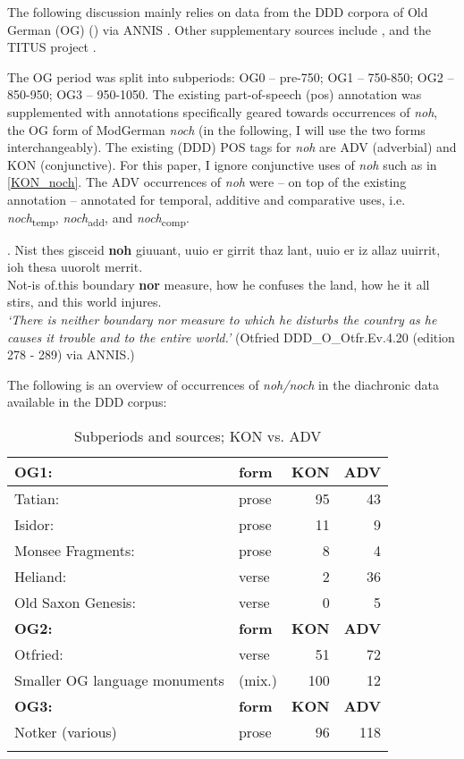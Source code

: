 \documentclass[output=paper,
modfonts
]{langscibook}
\begin{document}
The following discussion mainly relies on data from the DDD corpora of Old German (OG) (\citeauthor{ddd_OG}) via ANNIS \citep{annis_og}. Other supplementary sources include \citep{kali}, and the TITUS project \citep{titus}.

The OG period was split into subperiods: OG0 -- pre-750; OG1 -- 750-850; OG2 -- 850-950; OG3 -- 950-1050. The existing part-of-speech (pos) annotation was supplemented with annotations specifically geared towards occurrences of \textit{noh}, the OG form of ModGerman \textit{noch} (in the following, I will use the two forms interchangeably). The existing (DDD) POS tags for \textit{noh} are ADV (adverbial) and KON (conjunctive). For this paper, I ignore conjunctive uses of \textit{noh} such as in \ref{KON_noch}. The ADV occurrences of \textit{noh} were -- on top of the existing annotation -- annotated for temporal, additive and comparative uses, i.e. \textit{noch}\textsubscript{temp}, \textit{noch}\textsubscript{add}, and \textit{noch}\textsubscript{comp}.


\exg. Nist thes gisceid \textbf{noh} giuuant, uuio er girrit thaz lant, uuio er iz allaz uuirrit, ioh thesa uuorolt merrit.\label{KON_noch}\\
Not-is of.this boundary \textbf{nor} measure, how he confuses the land, how he it all stirs, and this world injures.\\
\textit{`There is neither boundary nor measure to which he disturbs the country as he causes it trouble and to the entire world.'} \flushright\vspace{-9pt} (Otfried DDD\_O\_Otfr.Ev.4.20 (edition 278 - 289) via ANNIS.) %

The following is an overview of occurrences of \textit{noh\slash noch} in the diachronic data available in the DDD corpus:

\begin{table}[H]\small
\begin{tabular}{l|l|r|r}
\lsptoprule
\textbf{OG1:} & \textbf{form} & \textbf{KON} & \textbf{ADV}  \\
\midrule
Tatian: & prose & 95 & 43  \\
\midrule
Isidor: & prose & 11 & 9 \\
\midrule
Monsee Fragments: & prose & 8 & 4 \\
\midrule
Heliand: & verse & 2 & 36 \\ %
\midrule
Old Saxon Genesis: & verse & 0 & 5 \\
\lsptoprule
\textbf{OG2:} & \textbf{form} & \textbf{KON} & \textbf{ADV}  \\
\midrule
Otfried: & verse & 51 & 72 \\
\midrule
Smaller OG language monuments & (mix.) & 100 & 12 \\
\lsptoprule
\textbf{OG3:} & \textbf{form} & \textbf{KON} & \textbf{ADV}  \\
\midrule
Notker (various) & prose & 96 & 118 \\
\lspbottomrule
\end{tabular}
\caption{Subperiods and sources; KON vs. ADV}
\label{tab:overview_subperiods_and_sources}
\end{table}
\end{document}
